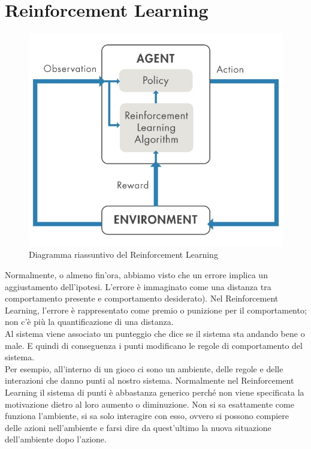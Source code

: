\section{Reinforcement Learning}

\begin{figure}[H]
    \centering
    \includegraphics[scale=.4]{imm/reinforce.jpg}
    \caption{Diagramma riassuntivo del Reinforcement Learning}
\end{figure}

Normalmente, o almeno fin'ora, abbiamo visto che un errore implica un aggiustamento dell’ipotesi. L’errore è immaginato come una distanza tra comportamento presente e comportamento desiderato). Nel Reinforcement Learning, l’errore è rappresentato come premio o punizione per il comportamento; non c’è più la quantificazione di una distanza.\\ 

Al sistema viene associato un punteggio che dice se il sistema sta andando bene o male. E quindi di conseguenza i punti modificano le regole di comportamento del sistema.\\

Per esempio, all'interno di un gioco ci sono un ambiente, delle regole e delle interazioni che danno punti al nostro sistema. Normalmente nel Reinforcement Learning il sistema di punti è abbastanza generico perché non viene specificata la motivazione dietro al loro aumento o diminuzione. Non si sa esattamente come funziona l’ambiente, si sa solo interagire con esso, ovvero si possono compiere delle azioni nell’ambiente e farsi dire da quest’ultimo la nuova situazione dell’ambiente dopo l’azione.\\

